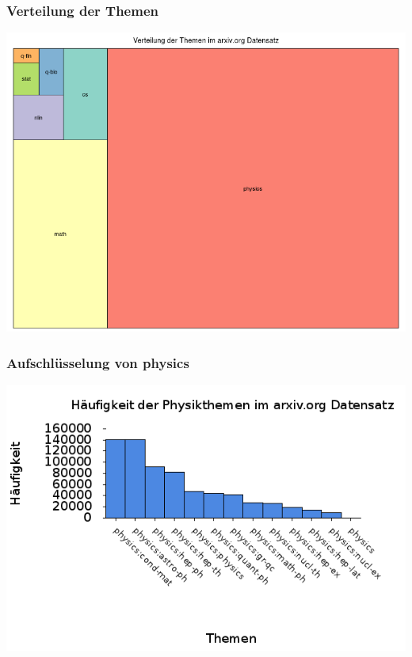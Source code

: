 \documentclass[12pt,utf8]{beamer}
\begin{document}
\begin{frame}
	\frametitle{Verteilung der Themen}
	\begin{center}
		\includegraphics[scale=0.35]{../visual/treeParent.png}
	\end{center}
\end{frame}
\begin{frame}
	\frametitle{Aufschlüsselung von physics}
	\begin{center}
		\includegraphics[scale=0.45]{../visual/setSpecFreq.png}
	\end{center}
\end{frame}
\end{document}
